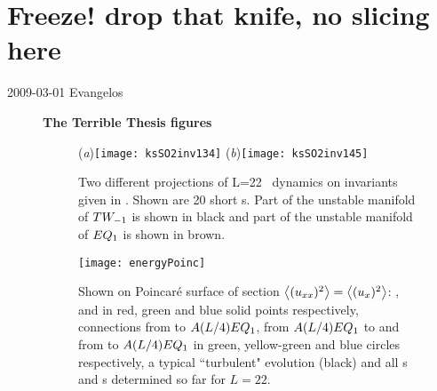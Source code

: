 \section{Freeze! drop that knife, no slicing here}
\label{sect:freeze}
\renewcommand{\LieElrep}{\ensuremath{g}} %

\begin{description}

\item[2009-03-01 Evangelos] {\bf The Terrible Thesis figures}

\begin{figure}
\begin{center}
  (\textit{a})\texttt{[image: ksSO2inv134]}
  (\textit{b})\texttt{[image: ksSO2inv145]}
\end{center}
\caption[\KS\  reduced  state-space projection II]
{Two different projections of L=22 \KS\ dynamics on
invariants given in . Shown are 20
short \rpo s. Part of the unstable manifold of $TW_{-1}$
is shown in black and part of the unstable manifold of
$EQ_{1}$ is shown in brown.}
\label{fig:SO2inv}
\end{figure}


\begin{figure}
\begin{center}
    \texttt{[image: energyPoinc]}
\end{center}
\caption[Poincar\'{e} surface of section for L=22]
        {
Shown on Poincar\'{e} surface of section
$\left\langle {(u_{xx})^2} \right\rangle = \left\langle {(u_{x})^2} \right\rangle$:
,  and  in red, green and blue solid points respectively,
connections from  to $A(L/4)EQ_{1}$,
from $A(L/4)EQ_{1}$ to  and from  to $A(L/4)EQ_{1}$ in green,
yellow-green and blue circles respectively,
a typical ``turbulent" evolution (black) and all \po s and \rpo s
determined so far for $L=22$.
        }
\label{f:drivedragPoinc}
\end{figure}


\end{description}
